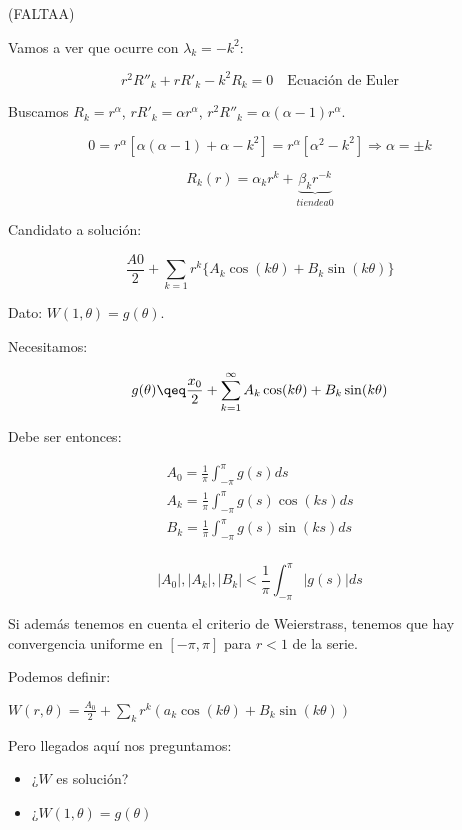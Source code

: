 		(FALTAA)










		Vamos a ver que ocurre con $\lambda_k = -k^2$:

		\[r^2 R''_k + r R'_k - k^2 R_k = 0 \quad \text{Ecuación de Euler}\]

		Buscamos $R_k = r^\alpha$, $rR'_k = \alpha r^\alpha$, $r^2 R''_k = \alpha(\alpha-1)r^\alpha$.

		\[ 0 = r^\alpha [\alpha(\alpha -1)+ \alpha - k^2] = r^\alpha [\alpha^2 - k^2] \Rightarrow \alpha = ± k \]

		\[ R_k(r) = \alpha_k r^k + \underbrace{\beta_k r^{-k}}_{tiende a 0}  \]


		Candidato a solución:

		\[\frac{A0}{2} + \sum_{k=1} r^k \{A_k \cos(k \theta) + B_k \sin(k\theta)\}   \]

		Dato: $W(1,\theta) = g(\theta)$.

		Necesitamos:

		\[ g(\theta) \qeq \frac{x_0}{2} + \sum_{k = 1}^{\infty} A_k \cos(k \theta) + B_k \sin(k \theta) \]

		Debe ser entonces:

		\[
		\begin{array}{l}
			A_0 = \frac{1}{\pi} \int_{-\pi}^{\pi} g(s) ds \\
			A_k = \frac{1}{\pi} \int_{-\pi}^{\pi} g(s)\cos(ks) ds \\
			B_k = \frac{1}{\pi} \int_{-\pi}^{\pi} g(s) \sin(ks) ds \\
		\end{array}
		\]

		\begin{obs}
			\[ |A_0|, |A_k|, |B_k| < \frac{1}{\pi} \int_{-\pi}^{\pi} |g(s)| ds \]

			Si además tenemos en cuenta el criterio de Weierstrass, tenemos que hay convergencia uniforme en $[-\pi,\pi]$ para $r<1$ de la serie.
		\end{obs}

		Podemos definir:

		\( W(r,\theta) = \frac{A_0}{2} + \sum_k r^k(a_k \cos(k \theta) + B_k \sin(k\theta)) \label{eq:serieW} \)

		Pero llegados aquí nos preguntamos:

		\begin{itemize}
			\item ¿$W$ es solución?
			\item ¿$W(1, \theta) = g(\theta)$
		\end{itemize}


